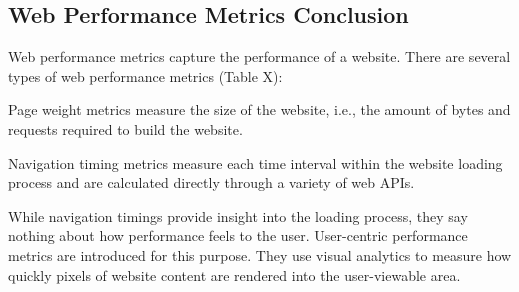 



\subsection{Web Performance Metrics Conclusion}

Web performance metrics capture the performance of a website.
There are several types of web performance metrics (Table X):

Page weight metrics measure the size of the website, i.e., the amount of bytes and requests required to build the website.

Navigation timing metrics measure each time interval within the website loading process and are calculated directly through a variety of web APIs.

While navigation timings provide insight into the loading process, they say nothing about how performance feels to the user.
User-centric performance metrics are introduced for this purpose.
They use visual analytics to measure how quickly pixels of website content are rendered into the user-viewable area.


